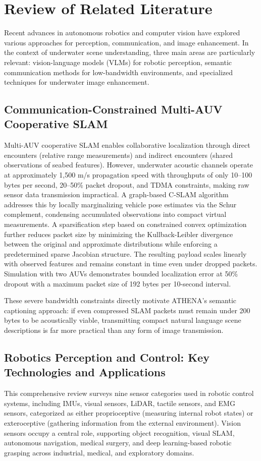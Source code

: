 \chapter{Review of Related Literature} \label{sec:rrl}
Recent advances in autonomous robotics and computer vision have explored various approaches for perception, communication, and image enhancement. In the context of underwater scene understanding, three main areas are particularly relevant: vision-language models (VLMs) for robotic perception, semantic communication methods for low-bandwidth environments, and specialized techniques for underwater image enhancement.

\section[Paull, Huang, Seto \& Leonard]{Communication-Constrained Multi-AUV Cooperative SLAM~\cite{lowbandwith}}
Multi-AUV cooperative SLAM enables collaborative localization through direct encounters (relative range measurements) and indirect encounters (shared observations of seabed features). However, underwater acoustic channels operate at approximately 1,500 m/s propagation speed with throughputs of only 10--100 bytes per second, 20--50\% packet dropout, and TDMA constraints, making raw sensor data transmission impractical. A graph-based C-SLAM algorithm addresses this by locally marginalizing vehicle pose estimates via the Schur complement, condensing accumulated observations into compact virtual measurements. A sparsification step based on constrained convex optimization further reduces packet size by minimizing the Kullback-Leibler divergence between the original and approximate distributions while enforcing a predetermined sparse Jacobian structure. The resulting payload scales linearly with observed features and remains constant in time even under dropped packets. Simulation with two AUVs demonstrates bounded localization error at 50\% dropout with a maximum packet size of 192 bytes per 10-second interval.

These severe bandwidth constraints directly motivate ATHENA's semantic captioning approach: if even compressed SLAM packets must remain under 200 bytes to be acoustically viable, transmitting compact natural language scene descriptions is far more practical than any form of image transmission.

\section[Luo, Zhou, Zeng, Jiang, Qi, Xiang, Pang \& Tang]{Robotics Perception and Control: Key Technologies and Applications~\cite{perception}}
This comprehensive review surveys nine sensor categories used in robotic control systems, including IMUs, visual sensors, LiDAR, tactile sensors, and EMG sensors, categorized as either proprioceptive (measuring internal robot states) or exteroceptive (gathering information from the external environment). Vision sensors occupy a central role, supporting object recognition, visual SLAM, autonomous navigation, medical surgery, and deep learning-based robotic grasping across industrial, medical, and exploratory domains.

